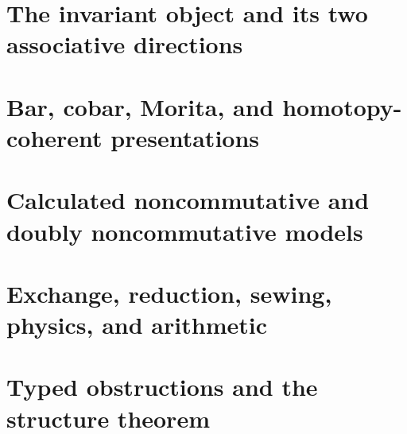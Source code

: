 \documentclass[10pt,oneside,openany]{book}
\theoremstyle{definition}
\theoremstyle{remark}
\begin{document}
\frontmatter

\tableofcontents

\mainmatter
\part{The invariant object and its two associative directions}

\part{Bar, cobar, Morita, and homotopy-coherent presentations}

\part{Calculated noncommutative and doubly noncommutative models}

\part{Exchange, reduction, sewing, physics, and arithmetic}

\part{Typed obstructions and the structure theorem}


\appendix


\backmatter
\nocite{*}


\printindex
\end{document}
